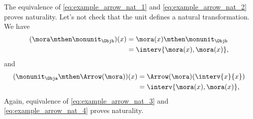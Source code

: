 %
The equivalence of \cref{eq:example_arrow_nat_1} and \cref{eq:example_arrow_nat_2} proves naturality.
Let's not check that the unit defines a natural transformation.
We have
%
\begin{equation}
	\label{eq:example_arrow_nat_3}
	\begin{aligned}
		(\mora \mthen \monunit_\Objb)(x)
		 & =\mora(x)\mthen \monunit_\Objb \\
		 & =\interv{\mora(x),\mora(x)},
	\end{aligned}
\end{equation}
%
and
%
\begin{equation}
	\label{eq:example_arrow_nat_4}
	\begin{aligned}
		(\monunit_\Obja \mthen \Arrow(\mora))(x)
		 & =\Arrow(\mora)(\interv{x}{x}) \\
		 & =\interv{\mora(x),\mora(x)},
	\end{aligned}
\end{equation}
%
Again, equivalence of \cref{eq:example_arrow_nat_3} and \cref{eq:example_arrow_nat_4} proves naturality.

